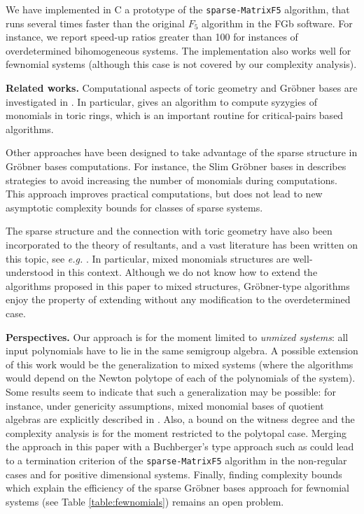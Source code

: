 \documentclass[12pt]{article}
\numberwithin{equation}{section}
\numberwithin{theorem}{section}
\begin{document}
We have implemented in C a prototype of the {\tt sparse-MatrixF5}
algorithm, that runs several times faster than the original $F_5$
algorithm in the FGb software. For instance, we report speed-up ratios
greater than 100 for instances of overdetermined bihomogeneous
systems. The implementation also works well for fewnomial systems
(although this case is not covered by our complexity analysis).

 {\bf Related works.}  Computational aspects of toric geometry
and Gr\"obner bases are investigated in \cite{Stu96}. In particular,
\cite[Subroutine 11.18]{Stu96} gives an algorithm to compute syzygies
of monomials in toric rings, which is an important routine for critical-pairs based algorithms.

Other approaches have been designed to take advantage of the sparse
structure in Gr\"obner bases computations. For instance, the Slim Gr\"obner
bases in \cite{brickenstein2010slimgb} describes strategies to avoid
increasing the number of monomials during computations. This
approach improves practical computations, but does not lead to new
asymptotic complexity bounds for classes of sparse systems.

The sparse structure and the connection with toric geometry have also
been incorporated to the theory of resultants, and a vast literature
has been written on this topic, see \emph{e.g.}
\cite{emiris2002symbolic, emiris2005toric,
  Canny99asubdivision,canny1993efficient}. In particular, mixed
monomials structures are well-understood in this context. Although we
do not know how to extend the algorithms proposed in this paper to
mixed structures, Gr\"obner-type algorithms enjoy the property of
extending without any modification to the overdetermined case.


 {\bf Perspectives.} Our approach is for the moment limited
to \emph{unmixed systems}: all input polynomials have to lie in the
same semigroup algebra. A possible extension of this work would be the
generalization to mixed systems (where the algorithms would depend on
the Newton polytope of each of the polynomials of the system). Some
results seem to indicate that such a generalization may be possible:
for instance, under genericity assumptions, mixed monomial bases of
quotient algebras are explicitly described in
\cite{pedersen1995mixed}. Also, a bound on the witness degree and the
complexity analysis is for the moment restricted to the polytopal
case. Merging the approach in this paper with a Buchberger's type
approach such as \cite[Algo.~11.17]{Stu96} could lead to a termination
criterion of the {\tt sparse-MatrixF5} algorithm in the non-regular cases
and for positive dimensional systems. Finally, finding complexity
bounds which explain the efficiency of the sparse Gr\"obner bases
approach for fewnomial systems (see Table \ref{table:fewnomials})
remains an open problem.
\end{document}
